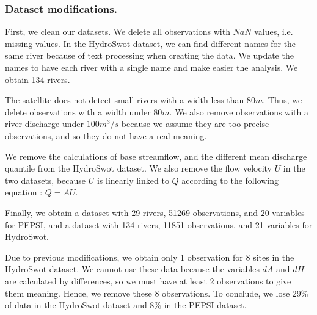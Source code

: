 \subsubsection{Dataset modifications.\label{section212}}

First, we clean our datasets. We delete all observations with $NaN$ values, i.e. missing values. In the HydroSwot dataset, we can find different names for the same river because of text processing when creating the data. We update the names to have each river with a single name and make easier the analysis. We obtain 134 rivers.

The satellite does not detect small rivers with a width less than $80m$. Thus, we delete observations with a width under $80m$. We also remove observations with a river discharge under $100 m^3/s$ because we assume they are too precise observations, and so they do not have a real meaning.

We remove the calculations of base streamflow, and the different mean discharge quantile from the HydroSwot dataset. We also remove the flow velocity $U$ in the two datasets, because $U$ is linearly linked to $Q$ according to the following equation : $Q = AU$.\newline

Finally, we obtain a dataset with 29 rivers, 51269 observations, and 20 variables for PEPSI, and a dataset with 134 rivers, 11851 observations, and 21 variables for HydroSwot.
        
Due to previous modifications, we obtain only 1 observation for 8 sites in the HydroSwot dataset. We cannot use these data because the variables $dA$ and $dH$ are calculated by differences, so we must have at least 2 observations to give them meaning. Hence, we remove these 8 observations. To conclude, we lose 29\% of data in the HydroSwot dataset and 8\% in the PEPSI dataset.




